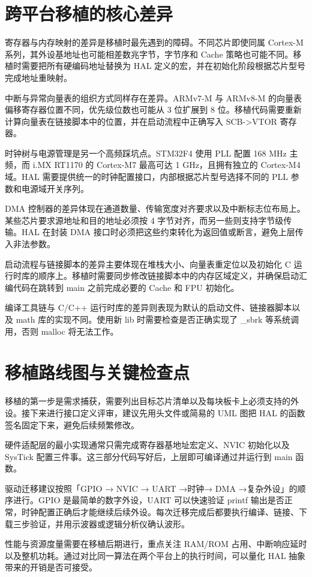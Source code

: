 \chapter{跨平台移植的核心差异}
寄存器与内存映射的差异是移植时最先遇到的障碍。不同芯片即使同属 Cortex-M 系列，其外设基地址也可能相差数兆字节，字节序和 Cache 策略也可能不同。移植时需要把所有硬编码地址替换为 HAL 定义的宏，并在初始化阶段根据芯片型号完成地址重映射。\par
中断与异常向量表的组织方式同样存在差异。ARMv7-M 与 ARMv8-M 的向量表偏移寄存器位置不同，优先级位数也可能从 3 位扩展到 8 位。移植代码需要重新计算向量表在链接脚本中的位置，并在启动流程中正确写入 SCB->VTOR 寄存器。\par
时钟树与电源管理是另一个高频踩坑点。STM32F4 使用 PLL 配置 168 MHz 主频，而 i.MX RT1170 的 Cortex-M7 最高可达 1 GHz，且拥有独立的 Cortex-M4 域。HAL 需要提供统一的时钟配置接口，内部根据芯片型号选择不同的 PLL 参数和电源域开关序列。\par
DMA 控制器的差异体现在通道数量、传输宽度对齐要求以及中断标志位布局上。某些芯片要求源地址和目的地址必须按 4 字节对齐，而另一些则支持字节级传输。HAL 在封装 DMA 接口时必须把这些约束转化为返回值或断言，避免上层传入非法参数。\par
启动流程与链接脚本的差异主要体现在堆栈大小、向量表重定位以及初始化 C 运行时库的顺序上。移植时需要同步修改链接脚本中的内存区域定义，并确保启动汇编代码在跳转到 main 之前完成必要的 Cache 和 FPU 初始化。\par
编译工具链与 C/C++ 运行时库的差异则表现为默认的启动文件、链接器脚本以及 math 库的实现不同。使用新 lib 时需要检查是否正确实现了 \_{}sbrk 等系统调用，否则 malloc 将无法工作。\par
\chapter{移植路线图与关键检查点}
移植的第一步是需求捕获，需要列出目标芯片清单以及每块板卡上必须支持的外设。接下来进行接口定义评审，建议先用头文件或简易的 UML 图把 HAL 的函数签名固定下来，避免后续频繁修改。\par
硬件适配层的最小实现通常只需完成寄存器基地址宏定义、NVIC 初始化以及 SysTick 配置三件事。这三部分代码写好后，上层即可编译通过并运行到 main 函数。\par
驱动迁移建议按照「GPIO → NVIC → UART →时钟→ DMA →复杂外设」的顺序进行。GPIO 是最简单的数字外设，UART 可以快速验证 printf 输出是否正常，时钟配置正确后才能继续后续外设。每次迁移完成后都要执行编译、链接、下载三步验证，并用示波器或逻辑分析仪确认波形。\par
性能与资源度量需要在移植后期进行，重点关注 RAM/ROM 占用、中断响应延时以及整机功耗。通过对比同一算法在两个平台上的执行时间，可以量化 HAL 抽象带来的开销是否可接受。\par
